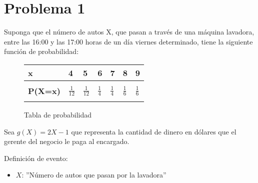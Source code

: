 \documentclass{templateNote}
\begin{document}
\portada
\margenes %

\section{Problema 1}
\indent
Suponga que el número de autos X, que pasan a través de una máquina lavadora, entre las 16:00 y las 17:00
horas de un día viernes determinado, tiene la siguiente función de probabilidad:

\begin{figure}[H]
    \begin{center}
        \begin{tabularx}{\textwidth}{|L|L|L|L|L|L|L|}
            \hline
            \textbf{x} & 4 & 5 & 6 & 7 & 8 & 9 \\
            \hline
            & & & & & & \\
            \textbf{P(X=x)} & $\displaystyle\frac{1}{12}$ & $\displaystyle\frac{1}{12}$ & $\displaystyle\frac{1}{4}$ & $\displaystyle\frac{1}{4}$ & $\displaystyle\frac{1}{6}$ & $\displaystyle\frac{1}{6}$ \\
            & & & & & & \\
            \hline
        \end{tabularx}
        \caption{Tabla de probabilidad}
    \end{center}
\end{figure}

Sea $g(X) = 2X - 1$ que representa la cantidad de dinero en dólares que el gerente del negocio le paga al
encargado.

Definición de evento:
\begin{itemize}
    \item $X$: ''Número de autos que pasan por la lavadora''
\end{itemize}
\end{document}

